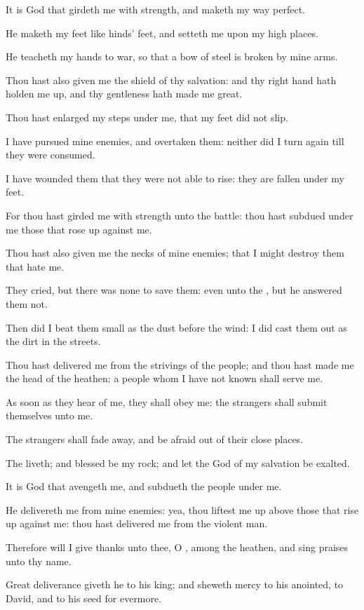 \verse It is God that girdeth me with strength, and maketh my way perfect.

\verse He maketh my feet like hinds' feet, and setteth me upon my high places.

\verse He teacheth my hands to war, so that a bow of steel is broken by mine arms.

\verse Thou hast also given me the shield of thy salvation: and thy right hand hath holden me up, and thy gentleness hath made me great.

\verse Thou hast enlarged my steps under me, that my feet did not slip.

\verse I have pursued mine enemies, and overtaken them: neither did I turn again till they were consumed.

\verse I have wounded them that they were not able to rise: they are fallen under my feet.

\verse For thou hast girded me with strength unto the battle: thou hast subdued under me those that rose up against me.

\verse Thou hast also given me the necks of mine enemies; that I might destroy them that hate me.

\verse They cried, but there was none to save them: even unto the \LORD, but he answered them not.

\verse Then did I beat them small as the dust before the wind: I did cast them out as the dirt in the streets.

\verse Thou hast delivered me from the strivings of the people; and thou hast made me the head of the heathen: a people whom I have not known shall serve me.

\verse As soon as they hear of me, they shall obey me: the strangers shall submit themselves unto me.

\verse The strangers shall fade away, and be afraid out of their close places.

\verse The \LORD liveth; and blessed be my rock; and let the God of my salvation be exalted.

\verse It is God that avengeth me, and subdueth the people under me.

\verse He delivereth me from mine enemies: yea, thou liftest me up above those that rise up against me: thou hast delivered me from the violent man.

\verse Therefore will I give thanks unto thee, O \LORD, among the heathen, and sing praises unto thy name.

\verse Great deliverance giveth he to his king; and sheweth mercy to his anointed, to David, and to his seed for evermore.





